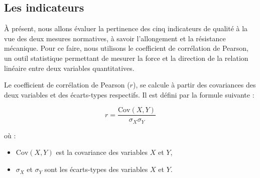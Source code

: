 \documentclass[12pt]{article}
\begin{document}
    


\subsection{Les indicateurs}

À présent, nous allons évaluer la pertinence des cinq indicateurs de 
qualité à la vue des deux mesures normatives, à savoir l'allongement 
et la résistance mécanique. Pour ce faire, nous utilisons le coefficient de corrélation de Pearson, 
un outil statistique permettant de mesurer la force et la direction de 
la relation linéaire entre deux variables quantitatives. 

Le coefficient de corrélation de Pearson (\( r \)), se calcule 
à partir des covariances des deux variables et des écarts-types respectifs.
Il est défini par la formule suivante :

\[
r = \frac{\text{Cov}(X,Y)}{\sigma_X \sigma_Y}
\]

où :
\begin{itemize}
    \item \(\text{Cov}(X,Y)\) est la covariance des variables \( X \) et \( Y \),
    \item \(\sigma_X\) et \(\sigma_Y\) sont les écarts-types des variables \( X \) et \( Y \).
\end{itemize}
\end{document}
